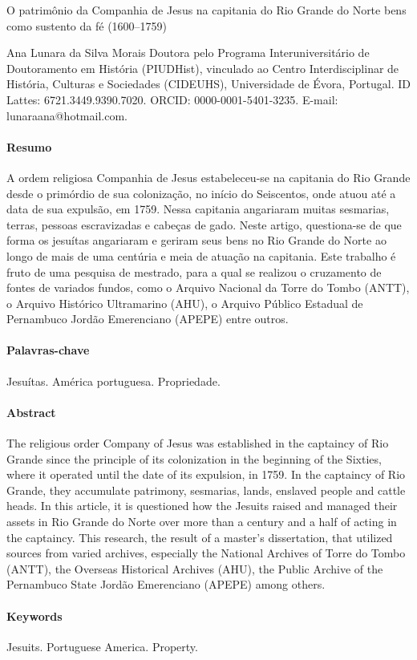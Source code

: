 \chapterTwoLines
{O patrimônio da Companhia de Jesus na capitania do Rio Grande do Norte}
{bens como sustento da fé (1600--1759)}

\articleAuthor
{Ana Lunara da Silva Morais}
{Doutora pelo Programa Interuniversitário de Doutoramento em História (PIUDHist), vinculado ao Centro Interdisciplinar de História, Culturas e Sociedades (CIDEUHS), Universidade de Évora, Portugal. ID Lattes: 6721.3449.9390.7020. ORCID: 0000-0001-5401-3235. E-mail: lunara\textunderscore{}{}ana@hotmail.com.}

\begin{small}
\paragraph{Resumo} A ordem religiosa Companhia de Jesus estabeleceu-se na capitania do Rio Grande desde o primórdio de sua colonização, no início do Seiscentos, onde atuou até a data de sua expulsão, em 1759. Nessa capitania angariaram muitas sesmarias, terras, pessoas escravizadas e cabeças de gado. Neste artigo, questiona-se de que forma os jesuítas angariaram e geriram seus bens no Rio Grande do Norte ao longo de mais de uma centúria e meia de atuação na capitania. Este trabalho é fruto de uma pesquisa de mestrado, para a qual se realizou o cruzamento de fontes de variados fundos, como o Arquivo Nacional da Torre do Tombo (ANTT), o Arquivo Histórico Ultramarino (AHU), o Arquivo Público Estadual de Pernambuco Jordão Emerenciano (APEPE) entre outros.
\paragraph{Palavras-chave} Jesuítas. América portuguesa. Propriedade.
\end{small}

\begin{small}
\begin{otherlanguage}{english}
\paragraph{Abstract} The religious order Company of Jesus was established in the captaincy of Rio Grande since the principle of its colonization in the beginning of the Sixties, where it operated until the date of its expulsion, in 1759. In the captaincy of Rio Grande, they accumulate patrimony, sesmarias, lands, enslaved people and cattle heads. In this article, it is questioned how the Jesuits raised and managed their assets in Rio Grande do Norte over more than a century and a half of acting in the captaincy. This research, the result of a master's dissertation, that utilized sources from varied archives, especially the National Archives of Torre do Tombo (ANTT), the Overseas Historical Archives (AHU), the Public Archive of the Pernambuco State Jordão Emerenciano (APEPE) among others.
\paragraph{Keywords} Jesuits. Portuguese America. Property.
\end{otherlanguage}
\end{small}

